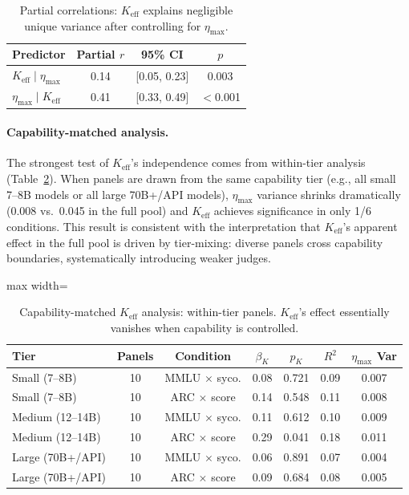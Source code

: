 \documentclass[11pt,a4paper]{article}
\begin{document}
\begin{table}[t]
\centering
\caption{Partial correlations: $K_{\mathrm{eff}}$ explains negligible unique variance after controlling for $\eta_{\max}$.}
\label{tab:partial_corr}
\small
\begin{tabular}{lccc}
\toprule
\textbf{Predictor} & \textbf{Partial $r$} & \textbf{95\% CI} & $p$ \\
\midrule
$K_{\mathrm{eff}} \mid \eta_{\max}$ & 0.14 & [0.05, 0.23] & 0.003 \\
$\eta_{\max} \mid K_{\mathrm{eff}}$ & 0.41 & [0.33, 0.49] & $<$0.001 \\
\bottomrule
\end{tabular}
\end{table}

\paragraph{Capability-matched analysis.}
The strongest test of $K_{\mathrm{eff}}$'s independence comes from within-tier analysis (Table~\ref{tab:cap_matched}).
When panels are drawn from the same capability tier (e.g., all small 7--8B models or all large 70B+/API models), $\eta_{\max}$ variance shrinks dramatically (0.008 vs.\ 0.045 in the full pool) and $K_{\mathrm{eff}}$ achieves significance in only 1/6 conditions.
This result is consistent with the interpretation that $K_{\mathrm{eff}}$'s apparent effect in the full pool is driven by tier-mixing: diverse panels cross capability boundaries, systematically introducing weaker judges.

\begin{table}[t]
\centering
\caption{Capability-matched $K_{\mathrm{eff}}$ analysis: within-tier panels. $K_{\mathrm{eff}}$'s effect essentially vanishes when capability is controlled.}
\label{tab:cap_matched}
\small
\begin{adjustbox}{max width=\textwidth}
\begin{tabular}{lcccccc}
\toprule
\textbf{Tier} & \textbf{Panels} & \textbf{Condition} & $\beta_{K}$ & $p_{K}$ & $R^2$ & $\eta_{\max}$ \textbf{Var} \\
\midrule
Small (7--8B) & 10 & MMLU $\times$ syco. & 0.08 & 0.721 & 0.09 & 0.007 \\
Small (7--8B) & 10 & ARC $\times$ score & 0.14 & 0.548 & 0.11 & 0.008 \\
Medium (12--14B) & 10 & MMLU $\times$ syco. & 0.11 & 0.612 & 0.10 & 0.009 \\
Medium (12--14B) & 10 & ARC $\times$ score & 0.29 & 0.041 & 0.18 & 0.011 \\
Large (70B+/API) & 10 & MMLU $\times$ syco. & 0.06 & 0.891 & 0.07 & 0.004 \\
Large (70B+/API) & 10 & ARC $\times$ score & 0.09 & 0.684 & 0.08 & 0.005 \\
\bottomrule
\end{tabular}
\end{adjustbox}
\end{table}
\end{document}

